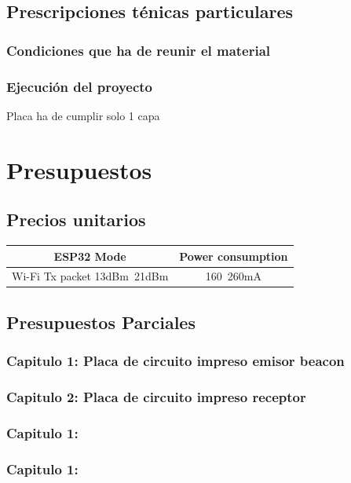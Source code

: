 \documentclass[a4paper ,12pt, onecolumn]{article}
\begin{document}
    \subsection{Prescripciones ténicas particulares}
        \subsubsection{Condiciones que ha de reunir el material}
        \subsubsection{Ejecución del proyecto}
        Placa ha de cumplir solo 1 capa
\section{Presupuestos}
    \subsection{Precios unitarios}
        \begin{center}
            \begin{tabular}{||c | c ||} 
            \hline
            ESP32 Mode & Power consumption  \\ [0.5ex] 
            \hline\hline
            Wi-Fi Tx packet 13dBm~21dBm & 160~260mA  \\ 
            \hline
            \end{tabular}
        \end{center}
    \subsection{Presupuestos Parciales}
        \subsubsection{Capitulo 1: Placa de circuito impreso emisor beacon}
        \subsubsection{Capitulo 2: Placa de circuito impreso receptor}
        \subsubsection{Capitulo 1: }
        \subsubsection{Capitulo 1: }
\end{document}
